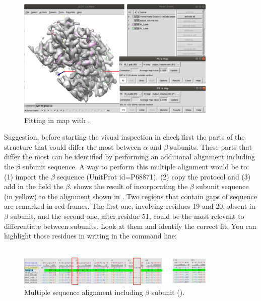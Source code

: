   \begin{figure}[H]
  \centering 
  \captionsetup{width=.7\linewidth} 
  \includegraphics[width=0.85\textwidth]{Images/Fig22}
  \caption{Fitting in map with \chimera.}
  \label{fig:chimera_fit_in_map}
  \end{figure}
   
  Suggestion, before starting the visual inspection in \chimera check first the parts of the structure that could differ the most between  $\alpha$ and $\beta$ subunits. These parts that differ the most can be identified by performing an additional alignment including the $\beta$ subunit sequence. A way to perform this multiple alignment would be to: (1) import the   $\beta$ sequence (UnitProt id=P68871), (2) copy the protocol  and (3) add in the  field the   $\beta$.  shows the result of incorporating the $\beta$ subunit sequence (in yellow) to the alignment shown in . Two regions that contain gaps of sequence are remarked in red frames. The first one, involving residues 19 and 20, absent in $\beta$ subunit, and the second one, after residue 51, could be the most relevant to differentiate between subunits. Look at them and identify the correct fit. You can highlight those residues in \chimera writing in the command line:\\
  \\
  
  \begin{figure}[H]
  \centering 
  \captionsetup{width=.7\linewidth} 
  \includegraphics[width=0.85\textwidth]{Images/Fig23}
  \caption{Multiple sequence alignment including  $\beta$ subunit ().}
  \label{fig:multiple_alignment_HBB}
  \end{figure}
  
